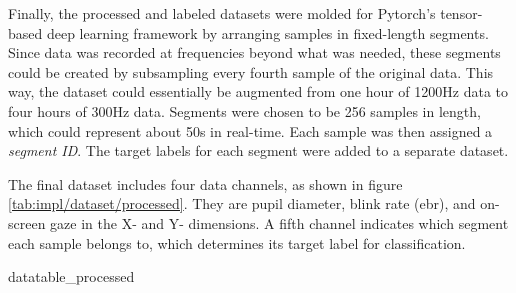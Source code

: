 Finally, the processed and labeled datasets were molded for Pytorch's tensor-based deep learning framework by arranging samples in fixed-length segments. Since data was recorded at frequencies beyond what was needed, these segments could be created by subsampling every fourth sample of the original data. This way, the dataset could essentially be augmented from one hour of 1200Hz data to four hours of 300Hz data. Segments were chosen to be 256 samples in length, which could represent about 50s in real-time. Each sample was then assigned a \textit{segment ID}. The target labels for each segment were added to a separate dataset.

The final dataset includes four data channels, as shown in figure \ref{tab:impl/dataset/processed}. They are pupil diameter, blink rate (\acrshort{ebr}), and on-screen gaze in the X- and Y- dimensions. A fifth channel indicates which segment each sample belongs to, which determines its target label for classification. 

{datatable_processed}



